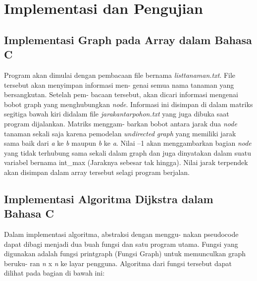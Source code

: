 \documentclass[conference]{IEEEtran}
\begin{document}

\section{Implementasi dan Pengujian}

\subsection{Implementasi Graph pada Array dalam Bahasa C}
    Program  akan  dimulai  dengan  pembacaan  file  bernama
    \emph{listtanaman.txt}. File tersebut akan menyimpan informasi men-
    genai semua nama tanaman yang bersangkutan. Setelah pem-
    bacaan tersebut, akan dicari informasi mengenai bobot graph
    yang menghubungkan \emph{node}. Informasi ini disimpan di dalam
    matriks  segitiga  bawah  kiri  didalam  file \emph{jarakantarpohon.txt}
    yang juga dibuka saat program dijalankan. Matriks menggam-
    barkan bobot antara jarak dua \emph{node} tanaman sekali saja karena
    pemodelan \emph{undirected graph} yang  memiliki jarak  sama  baik
    dari \emph{a} ke \emph{b} maupun \emph{b} ke \emph{a}.  Nilai --1 akan menggambarkan
    bagian \emph{node} yang  tidak  terhubung  sama  sekali  dalam  graph
    dan  juga  dinyatakan  dalam  suatu  variabel  bernama  int\_max
    (Jaraknya  sebesar  tak  hingga).  Nilai  jarak  terpendek  akan
    disimpan dalam array tersebut selagi program berjalan.

\subsection{Implementasi Algoritma Dijkstra dalam Bahasa C}
    
    Dalam  implementasi  algoritma,  abstraksi  dengan  menggu-
    nakan pseudocode dapat dibagi menjadi dua buah fungsi dan
    satu  program  utama.  Fungsi  yang  digunakan  adalah  fungsi
    printgraph (Fungsi Graph) untuk memunculkan graph beruku-
    ran \emph{n} x \emph{n} ke  layar  pengguna.  Algoritma  dari  fungsi  tersebut
    dapat dilihat pada bagian di bawah ini:\par
\end{document}
